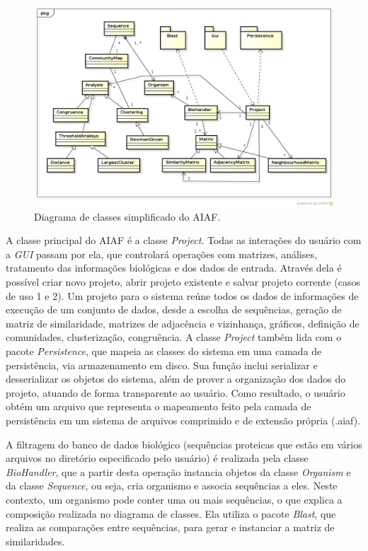 \begin{figure}
\centering
\includegraphics[scale=0.52]{diagrama-classes-simplificado}
\caption{Diagrama de classes simplificado do AIAF.}
\label{fig:diagrama-classes-simplificado}
\end{figure}

A classe principal do AIAF é a classe \textit{Project}. Todas as interações do usuário com a \textit{GUI} passam por ela, que controlará operações com
matrizes, análises, tratamento das informações biológicas e dos dados de entrada. Através dela é possível criar novo projeto, abrir projeto existente e
salvar projeto corrente (casos de uso 1 e 2). Um projeto para o sistema reúne todos os dados de informações de execução de um conjunto de dados, desde
a escolha de sequências, geração de matriz de similaridade, matrizes de adjacência e vizinhança, gráficos, definição de comunidades, clusterização,
congruência. A classe \textit{Project} também lida com o pacote \textit{Persistence}, que mapeia as classes do sistema em uma camada de persistência, via
armazenamento em disco. Sua função inclui serializar e desserializar os objetos do sistema, além de prover
a organização dos dados do projeto, atuando de forma transparente ao usuário. Como resultado, o usuário obtém um arquivo que representa o mapeamento
feito pela camada de persistência em um sistema de arquivos comprimido e de extensão própria (.aiaf).


A filtragem do banco de dados biológico (sequências proteicas que estão em vários arquivos no diretório especificado pelo usuário) é realizada pela classe
\textit{BioHandler}, que a partir desta operação instancia objetos da classe \textit{Organism} e da classe \textit{Sequence}, ou seja, cria organismo e associa
sequências a eles. Neste contexto, um organismo pode conter uma ou mais sequências, o que explica a composição realizada no diagrama de classes.
Ela utiliza o pacote \textit{Blast}, que realiza as comparações entre sequências, para gerar e instanciar a matriz de similaridades.

